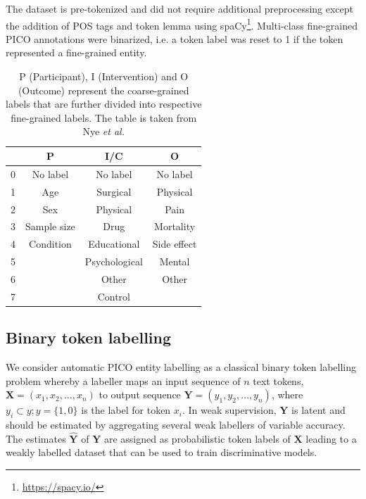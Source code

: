 \documentclass[10.7pt,]{article}
\begin{document}
The dataset is pre-tokenized and did not require additional preprocessing except the addition of POS tags and token lemma using spaCy\footnote{\url{https://spacy.io/}}.
Multi-class fine-grained PICO annotations were binarized, i.e. a token label was reset to 1 if the token represented a fine-grained entity.
%
\begin{table}[h!]
\begin{center}
\begin{tabular}{| c | c | c | c |} 
\hline
 & P & I/C & O \\ 
\hline
0 & No label & No label & No label \\ 
1 & Age & Surgical & Physical \\ 
2 & Sex & Physical & Pain \\
3 & Sample size & Drug & Mortality \\
4 & Condition & Educational & Side effect \\
5 &  & Psychological & Mental \\
6 &  & Other & Other \\
7 &  & Control &  \\
\hline
\end{tabular}
\caption{\label{tab:coarsefineconcept} P (Participant), I (Intervention) and O (Outcome) represent the coarse-grained labels that are further divided into respective fine-grained labels. The table is taken from Nye \textit{et al.}\cite{nye2018corpus}}
\end{center}
\end{table}
%
\subsection{Binary token labelling}\label{seq_lab}
%
We consider automatic PICO entity labelling as a classical binary token labelling problem whereby a labeller maps an input sequence of $n$ text tokens, $ \bm{X} = (x_{1}, x_{2}, \dotso , x_{n} )$ to output sequence $\bm{Y} = (y_{1}, y_{2}, \dotso , y_{n} )$, where $y_{i} \subset y; y = \{1,0\} $ is the label for token $x_{i}$.
In weak supervision, $\bm{Y}$ is latent and should be estimated by aggregating several weak labellers of variable accuracy.
The estimates $\bm{\hat{Y}}$ of $\bm{Y}$ are assigned as probabilistic token labels of $\bm{X}$ leading to a weakly labelled dataset that can be used to train discriminative models.
%
%
%
\end{document}

